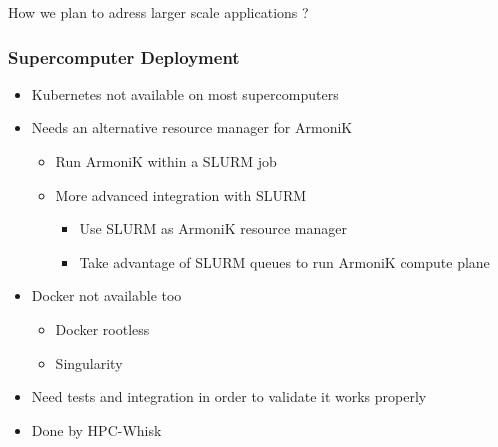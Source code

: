 \documentclass[10pt,aspectratio=1609]{beamer}
\begin{document}
\begin{section}{How we plan to adress larger scale applications ?}
  \begin{frame}
    \frametitle{Supercomputer Deployment}
    \begin{itemize}
      \item Kubernetes not available on most supercomputers
      \item Needs an alternative resource manager for ArmoniK
      \begin{itemize}
        \item Run ArmoniK within a SLURM job
        \item More advanced integration with SLURM
        \begin{itemize}
          \item Use SLURM as ArmoniK resource manager
          \item Take advantage of SLURM queues to run ArmoniK compute plane
        \end{itemize}
      \end{itemize}
      \item Docker not available too
      \begin{itemize}
        \item Docker rootless
        \item Singularity
      \end{itemize}
      \item Need tests and integration in order to validate it works properly
      \item Done by HPC-Whisk
    \end{itemize}
  \end{frame}


\end{section}
\end{document}
